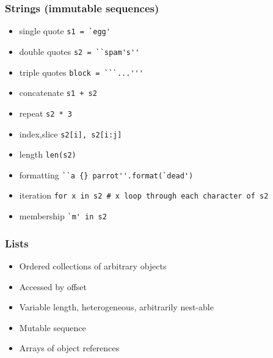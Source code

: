 \begin{frame}[fragile]\frametitle{Strings (immutable sequences)}
  \begin{itemize}
  \item single quote \lstinline{s1 = `egg'}
\item double quotes \lstinline{s2 = ``spam's''}
\item triple quotes \lstinline{block = ```...'''}
\item concatenate \lstinline{s1 + s2}
\item repeat \lstinline{s2 * 3}
\item index,slice \lstinline{s2[i], s2[i:j]}
\item length \lstinline{len(s2)}
\item formatting \lstinline|``a {} parrot''.format(`dead')|
\item iteration \lstinline{for x in s2 # x loop through each character of s2}
\item membership \lstinline{`m' in s2}
  \end{itemize}
\end{frame}

\begin{frame}[fragile]\frametitle{Lists}
  \begin{itemize}
  \item Ordered collections of arbitrary objects
  \item Accessed by offset
  \item Variable length, heterogeneous, arbitrarily nest-able
  \item Mutable sequence
  \item Arrays of object references
  \end{itemize}
\end{frame}

